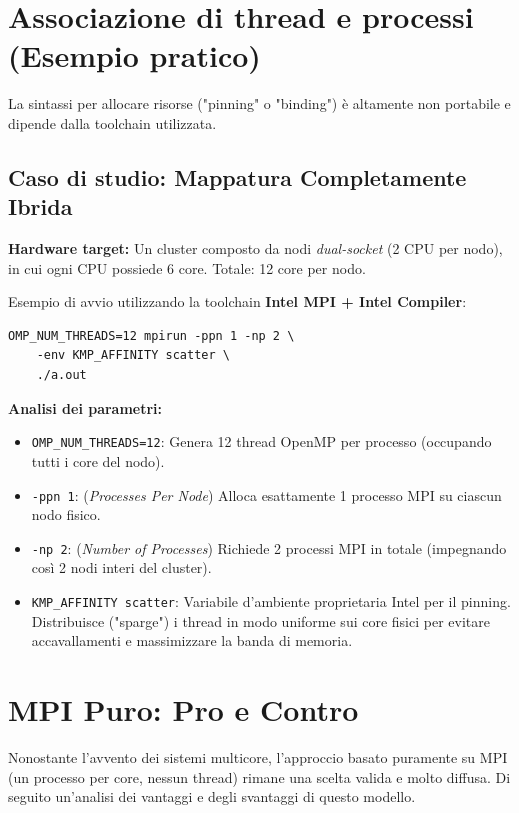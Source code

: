 \section*{Associazione di thread e processi (Esempio pratico)}

La sintassi per allocare risorse ("pinning" o "binding") è altamente non portabile e dipende dalla toolchain utilizzata. 

\subsection*{Caso di studio: Mappatura Completamente Ibrida}
\textbf{Hardware target:} Un cluster composto da nodi \textit{dual-socket} (2 CPU per nodo), in cui ogni CPU possiede 6 core. Totale: 12 core per nodo.

\vspace{0.3cm}
Esempio di avvio utilizzando la toolchain \textbf{Intel MPI + Intel Compiler}:
\begin{verbatim}
OMP_NUM_THREADS=12 mpirun -ppn 1 -np 2 \
    -env KMP_AFFINITY scatter \
    ./a.out
\end{verbatim}

\textbf{Analisi dei parametri:}
\begin{itemize}
    \item \texttt{OMP\_NUM\_THREADS=12}: Genera 12 thread OpenMP per processo (occupando tutti i core del nodo).
    \item \texttt{-ppn 1}: (\textit{Processes Per Node}) Alloca esattamente 1 processo MPI su ciascun nodo fisico.
    \item \texttt{-np 2}: (\textit{Number of Processes}) Richiede 2 processi MPI in totale (impegnando così 2 nodi interi del cluster).
    \item \texttt{KMP\_AFFINITY scatter}: Variabile d'ambiente proprietaria Intel per il pinning. Distribuisce ("sparge") i thread in modo uniforme sui core fisici per evitare accavallamenti e massimizzare la banda di memoria.
\end{itemize}

\section*{MPI Puro: Pro e Contro}

Nonostante l'avvento dei sistemi multicore, l'approccio basato puramente su MPI (un processo per core, nessun thread) rimane una scelta valida e molto diffusa. Di seguito un'analisi dei vantaggi e degli svantaggi di questo modello.

